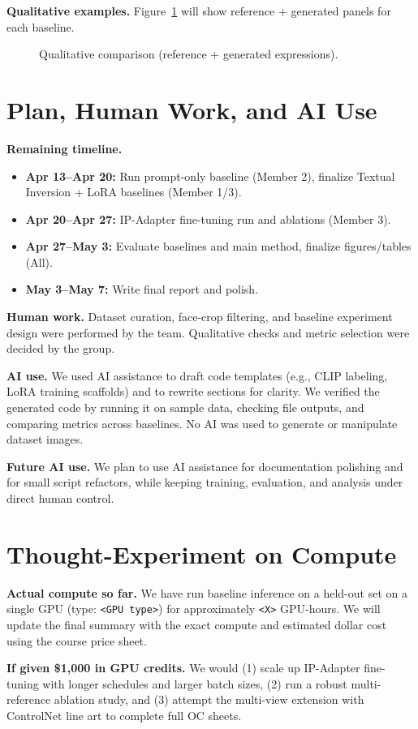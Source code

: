 \documentclass[twocolumn,11pt]{article}
\begin{document}
\textbf{Qualitative examples.} Figure~\ref{fig:qual} will show reference + generated panels for each baseline.

\begin{figure}[h]
    \centering
    \caption{Qualitative comparison (reference + generated expressions).}
    \label{fig:qual}
\end{figure}

\section{Plan, Human Work, and AI Use}
\textbf{Remaining timeline.}
\begin{itemize}[leftmargin=*,nosep]
    \item \textbf{Apr 13--Apr 20:} Run prompt-only baseline (Member 2), finalize Textual Inversion + LoRA baselines (Member 1/3).
    \item \textbf{Apr 20--Apr 27:} IP-Adapter fine-tuning run and ablations (Member 3).
    \item \textbf{Apr 27--May 3:} Evaluate baselines and main method, finalize figures/tables (All).
    \item \textbf{May 3--May 7:} Write final report and polish.
\end{itemize}

\textbf{Human work.} Dataset curation, face-crop filtering, and baseline experiment design were performed by the team. Qualitative checks and metric selection were decided by the group.

\textbf{AI use.} We used AI assistance to draft code templates (e.g., CLIP labeling, LoRA training scaffolds) and to rewrite sections for clarity. We verified the generated code by running it on sample data, checking file outputs, and comparing metrics across baselines. No AI was used to generate or manipulate dataset images.

\textbf{Future AI use.} We plan to use AI assistance for documentation polishing and for small script refactors, while keeping training, evaluation, and analysis under direct human control.

\section{Thought-Experiment on Compute}
\textbf{Actual compute so far.} We have run baseline inference on a held-out set on a single GPU (type: \texttt{<GPU type>}) for approximately \texttt{<X>} GPU-hours. We will update the final summary with the exact compute and estimated dollar cost using the course price sheet.

\textbf{If given \$1{,}000 in GPU credits.} We would (1) scale up IP-Adapter fine-tuning with longer schedules and larger batch sizes, (2) run a robust multi-reference ablation study, and (3) attempt the multi-view extension with ControlNet line art to complete full OC sheets.

\clearpage


\end{document}
